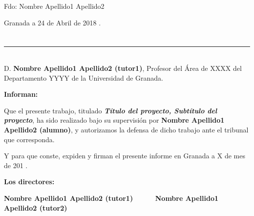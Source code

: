 \vspace{6cm}

\noindent Fdo: Nombre Apellido1 Apellido2

\vspace{2cm}

\begin{flushright}
Granada a 24 de Abril de 2018 .
\end{flushright}


\chapter*{}
\thispagestyle{empty}

\noindent\rule[-1ex]{\textwidth}{2pt}\\[4.5ex]

D. \textbf{Nombre Apellido1 Apellido2 (tutor1)}, Profesor del Área de XXXX del Departamento YYYY de la Universidad de Granada.

\vspace{0.5cm}

\textbf{Informan:}

\vspace{0.5cm}

Que el presente trabajo, titulado \textit{\textbf{Título del proyecto, Subtítulo del proyecto}},
ha sido realizado bajo su supervisión por \textbf{Nombre Apellido1 Apellido2 (alumno)}, y autorizamos la defensa de dicho trabajo ante el tribunal
que corresponda.

\vspace{0.5cm}

Y para que conste, expiden y firman el presente informe en Granada a X de mes de 201 .

\vspace{1cm}

\textbf{Los directores:}

\vspace{5cm}

\noindent \textbf{Nombre Apellido1 Apellido2 (tutor1) \ \ \ \ \ Nombre Apellido1 Apellido2 (tutor2)}


